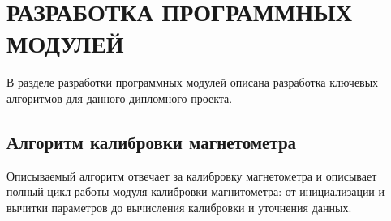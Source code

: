\section{РАЗРАБОТКА ПРОГРАММНЫХ МОДУЛЕЙ}
\label{sec:dev}

В разделе разработки программных модулей
описана разработка ключевых алгоритмов для данного дипломного проекта.

\subsection{Алгоритм калибровки магнетометра}

Описываемый алгоритм отвечает за калибровку магнетометра и описывает полный цикл работы модуля калибровки магнитометра: от инициализации и вычитки параметров до
вычисления калибровки и уточнения данных. 

